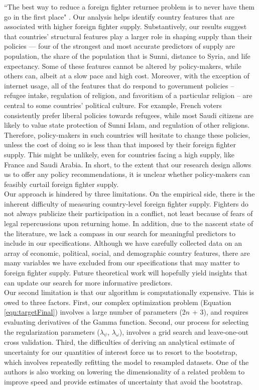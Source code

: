 \documentclass[12pt]{article}
\begin{document}
``The best way to reduce a foreign fighter returnee problem is to never have them go in the first place" \citep[p. 15]{Byman2015a}. Our analysis helps identify country features that are associated with higher foreign fighter supply. Substantively, our results suggest that countries' structural features play a larger role in shaping supply than their policies --- four of the strongest and most accurate predictors of supply are population, the share of the population that is Sunni, distance to Syria, and life expectancy. Some of these features cannot be altered by policy-makers, while others can, albeit at a slow pace and high cost. Moreover, with the exception of internet usage, all of the features that do respond to government policies -- refugee intake, regulation of religion, and favoritism of a particular religion -- are central to some countries' political culture. For example, French voters consistently prefer liberal policies towards refugees, while most Saudi citizens are likely to value state protection of Sunni Islam, and regulation of other religions. Therefore, policy-makers in such countries will hesitate to change these policies, unless the cost of doing so is less than that imposed by their foreign fighter supply. This might be unlikely, even for countries facing a high supply, like France and Saudi Arabia. In short, to the extent that our research design allows us to offer any policy recommendations, it is unclear whether policy-makers can feasibly curtail foreign fighter supply.	\\

Our approach is hindered by three limitations. On the empirical side, there is the inherent difficulty of measuring country-level foreign fighter supply. Fighters do not always publicize their participation in a conflict, not least because of fears of legal repercussions upon returning home. In addition, due to the nascent state of the literature, we lack a compass in our search for meaningful predictors to include in our specifications. Although we have carefully collected data on an array of economic, political, social, and demographic country features, there are many variables we have excluded from our specifications that may matter to foreign fighter supply. Future theoretical work will hopefully yield insights that can update our search for more informative predictors.		\\

Our second limitation is that our algorithm is computationally expensive. This is owed to three factors. First, our complex optimization problem (Equation \ref{eqn:targetFinal}) involves a large number of parameters (2$n$ + 3), and requires evaluating derivatives of the Gamma function. Second, our process for selecting the regularization parameters ($\lambda_\psi$, $\lambda_\omega$), involves a grid search and leave-one-out cross validation. Third, the difficulties of deriving an analytical estimate of uncertainty for our quantities of interest force us to resort to the bootstrap, which involves repeatedly refitting the model to resampled datasets. One of the authors is also working on lowering the dimensionality of a related problem to improve speed and provide estimates of uncertainty that avoid the bootstrap.	\\ 
\end{document}
